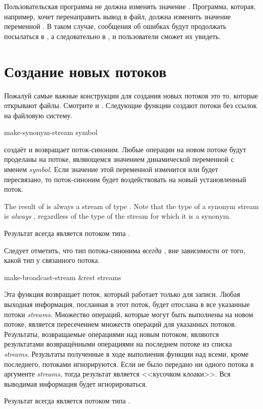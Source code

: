 Пользовательская программа не должна изменять значение
. Программа, которая, например, хочет перенаправить вывод в файл,
должна изменить значение переменной . В таком случае,
сообщения об ошибках будут продолжать посылаться в , а
следовательно в , и пользователи сможет их увидеть.

\section {Создание новых потоков}

Пожалуй самые важные конструкции для создания новых потоков это то, которые
открывают файлы. Смотрите  и .
Следующие функции создают потоки без ссылок на файловую систему.

\begin{defun}[Функция]
make-synonym-stream symbol

 создаёт и возвращает поток-синоним.
Любые операции на новом потоке будут проделаны на потоке, являющемся значением
динамической переменной с именем \emph{symbol}.
Если значение этой переменной изменится или будет пересвязано, то поток-синоним
будет воздействовать на новый установленный поток.

The result of
 is always a stream of type .
Note that the type of a synonym stream is \emph{always} ,
regardless of the type of the stream for which it is a synonym.

Результат  всегда является потоком типа
.

Следует отметить, что тип потока-синонима \emph{всегда} ,
вне зависимости от того, какой тип у связанного потока.
\end{defun}

\begin{defun}[Функция]
make-broadcast-stream &rest streams

Эта функция возвращает поток, который работает только для записи. Любая выходная
информация, посланная в этот поток, будет отослана в все указанные потоки
\emph{streams}.
Множество операций, которые могут быть выполнены на новом потоке, является
пересечением множеств операций для указанных потоков. Результаты, возвращаемые
операциями над новым потоком, являются результатами возвращёнными операциями на
последнем потоке из списка \emph{streams}.
Результаты полученные в ходе выполнения функции над всеми, кроме последнего,
потоками игнорируются.
Если не было передано ни одного потока в аргументе \emph{streams}, тогда
результат является <<кусочком клоаки>>. Вся выводимая информация будет
игнорироваться.

Результат  всегда является потоком типа
.
\end{defun}

